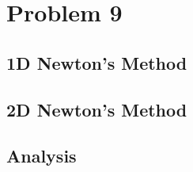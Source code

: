 \documentclass[11pt]{article} %
\begin{document}
\section*{Problem 9}
\subsection*{1D Newton's Method}

\subsection*{2D Newton's Method}

\subsection*{Analysis}
\end{document}
